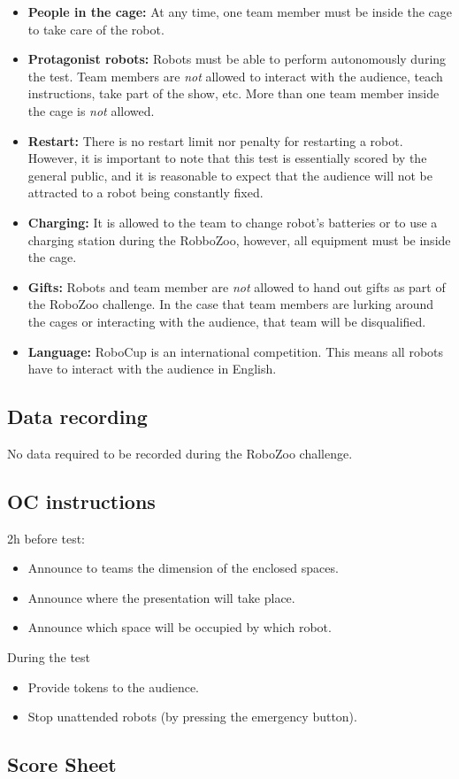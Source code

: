 \begin{itemize}
\item \textbf{People in the cage:} At any time, one team member must be inside the cage to take care of the robot. 

\item \textbf{Protagonist robots:} Robots must be able to perform autonomously during the test. Team members are \emph{not} allowed to interact with the audience, teach instructions, take part of the show, etc. More than one team member inside the cage is \emph{not} allowed.

\item \textbf{Restart:} There is no restart limit nor penalty for restarting a robot. However, it is important to note that this test is essentially scored by the general public, and it is reasonable to expect that the audience will not be attracted to a robot being constantly fixed. 

\item \textbf{Charging:} It is allowed to the team to change robot's batteries or to use a charging station during the RobboZoo, however, all equipment must be inside the cage. 

\item \textbf{Gifts:} Robots and team member are \emph{not} allowed to hand out gifts as part of the RoboZoo challenge. In the case that team members are lurking around the cages or interacting with the audience, that team will be disqualified.

\item \textbf{Language:} RoboCup is an international competition. This means all robots have to interact with the audience in English. 
\end{itemize}

\subsection{Data recording}
No data required to be recorded during the RoboZoo challenge.

\subsection{OC instructions}

2h before test:
\begin{itemize}
\item Announce to teams the dimension of the enclosed spaces.
\item Announce where the presentation will take place.
\item Announce which space will be occupied by which robot.
\end{itemize}

During the test
\begin{itemize}
\item Provide tokens to the audience.
\item Stop unattended robots (by pressing the emergency button).
\end{itemize}

\subsection{Score Sheet}



